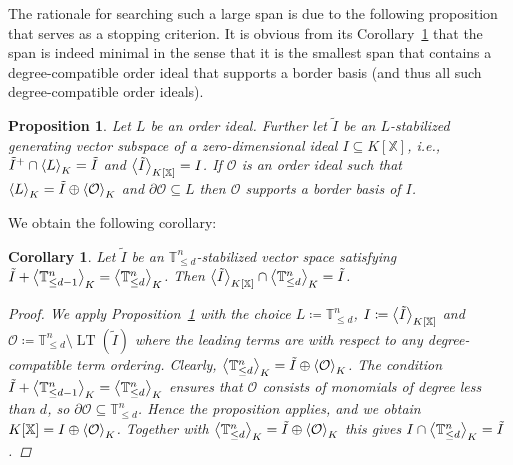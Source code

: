 \documentclass[11pt,oneside,english]{amsart}
\makeatletter
\numberwithin{equation}{section}
\numberwithin{figure}{section}
\theoremstyle{plain}
\newtheorem{corollary}[thm]{Corollary}
\theoremstyle{definition}
\theoremstyle{definition}
\theoremstyle{remark}
\theoremstyle{plain}
\theoremstyle{plain}
\theoremstyle{plain}
\newtheorem{prop}[thm]{Proposition}
\theoremstyle{problem@}
\makeatother
\begin{document}
The rationale for searching such a large span is due to
the following proposition
that serves as a stopping criterion.
It is obvious from its Corollary~\ref{cor:idealApprox}
that the span is indeed minimal in the sense that
it is the smallest span that contains a degree-compatible order ideal
that supports a border basis (and thus all such degree-compatible order ideals).

\begin{prop}
\label{pro:bbApproximation}
\cite[Proposition 16]{kehrein2006cbb}
Let $L$ be an order ideal.
Further let $\tilde{I}$ be an \(L\)-stabilized generating vector subspace of a zero-dimensional
ideal $I\subseteq{K[\mathbb{X}]}$, i.e., ${\tilde{I}}^{+}\cap {{\left\langle {L}\right\rangle}\sb{K}}=\tilde{I}$
and ${{\left\langle {\tilde{I}}\right\rangle}\sb{K[\mathbb{X}]}}=I$. If ${\mathcal{O}}$ is an
order ideal such that ${{\left\langle {L}\right\rangle}\sb{K}}=\tilde{I}\oplus{{\left\langle {\mathcal{O}}\right\rangle}\sb{K}}$ and $\partial{\mathcal{O}}\subseteq L$
then ${\mathcal{O}}$ supports a border basis of $I$.
\end{prop}

We obtain the following corollary:

\begin{corollary}
  \label{cor:idealApprox}
  Let \(\tilde{I}\) be an \({\mathbb{T}}^{n}_{\leq d}\)-stabilized vector space
  satisfying \(\tilde{I} + {{\left\langle {{\mathbb{T}}^{n}_{\leq d-1}}\right\rangle}\sb{K}} = {{\left\langle {{\mathbb{T}}^{n}_{\leq d}}\right\rangle}\sb{K}}\).
  Then \({{\left\langle {\tilde{I}}\right\rangle}\sb{K[\mathbb{X}]}} \cap {{\left\langle {{\mathbb{T}}^{n}_{\leq d}}\right\rangle}\sb{K}} = \tilde{I}\).
\begin{proof}
We apply Proposition~\ref{pro:bbApproximation} with the choice
\(L \coloneqq {\mathbb{T}}^{n}_{\leq d}\),
\(I \coloneqq {{\left\langle {\tilde{I}}\right\rangle}\sb{K[\mathbb{X}]}}\)
and
\({\mathcal{O}} \coloneqq {\mathbb{T}}^{n}_{\leq d} \setminus \operatorname{LT}(\tilde{I})\)
where the leading terms are
with respect to any degree-compatible term ordering.
Clearly,
\({{\left\langle {{\mathbb{T}}^{n}_{\leq d}}\right\rangle}\sb{K}}= \tilde{I} \oplus {{\left\langle {\mathcal{O}}\right\rangle}\sb{K}}\).
The condition
\(\tilde{I} + {{\left\langle {{\mathbb{T}}^{n}_{\leq d-1}}\right\rangle}\sb{K}} = {{\left\langle {{\mathbb{T}}^{n}_{\leq d}}\right\rangle}\sb{K}}\)
ensures that
\({\mathcal{O}}\) consists of monomials of degree less than \(d\),
so \(\partial{\mathcal{O}} \subseteq {\mathbb{T}}^{n}_{\leq d}\).
Hence the proposition applies,
and we obtain \({K[\mathbb{X}]} = I \oplus {{\left\langle {\mathcal{O}}\right\rangle}\sb{K}}\).
Together with
\({{\left\langle {{\mathbb{T}}^{n}_{\leq d}}\right\rangle}\sb{K}}= \tilde{I} \oplus {{\left\langle {\mathcal{O}}\right\rangle}\sb{K}}\)
this gives
\(I \cap {{\left\langle {{\mathbb{T}}^{n}_{\leq d}}\right\rangle}\sb{K}} = \tilde{I}\).
\end{proof}
\end{corollary}
\end{document}
